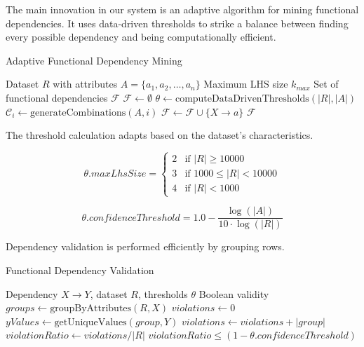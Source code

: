 \documentclass[sigconf]{acmart}
\begin{document}
The main innovation in our system is an adaptive algorithm for mining functional dependencies. It uses data-driven thresholds to strike a balance between finding every possible dependency and being computationally efficient.

\begin{algorithm}
\caption{Adaptive Functional Dependency Mining}
\label{alg:fd-mining}
\begin{algorithmic}[1]
\REQUIRE Dataset $R$ with attributes $A = \{a_1, a_2, \ldots, a_n\}$
\REQUIRE Maximum LHS size $k_{max}$
\ENSURE Set of functional dependencies $\mathcal{F}$
\STATE $\mathcal{F} \leftarrow \emptyset$
\STATE $\theta \leftarrow 
\text{computeDataDrivenThresholds}(|R|, |A|)$
    \STATE $\mathcal{C}_i \leftarrow \text{generateCombinations}(A, i)$
                \STATE $\mathcal{F} \leftarrow \mathcal{F} \cup \{X \rightarrow a\}$
            \ENDIF
        \ENDFOR
    \ENDFOR
\ENDFOR
\STATE \RETURN $\mathcal{F}$
\end{algorithmic}
\end{algorithm}

The threshold calculation adapts based on the dataset's characteristics.

$$\theta.maxLhsSize = \begin{cases}
2 & \text{if } |R| \geq 10000 \\
3 & \text{if } 1000 \leq |R| < 10000 \\
4 & \text{if } |R| < 1000
\end{cases}$$

$$\theta.confidenceThreshold = 1.0 - \frac{\log(|A|)}{10 \cdot \log(|R|)}$$

Dependency validation is performed efficiently by grouping rows.

\begin{algorithm}
\caption{Functional Dependency Validation}
\label{alg:fd-validate}
\begin{algorithmic}[1]
\REQUIRE Dependency $X \rightarrow Y$, dataset $R$, thresholds $\theta$
\ENSURE Boolean validity
\STATE $groups \leftarrow \text{groupByAttributes}(R, X)$
\STATE $violations \leftarrow 0$
    \STATE $yValues \leftarrow \text{getUniqueValues}(group, Y)$
        \STATE $violations \leftarrow violations + |group|$
    \ENDIF
\ENDFOR
\STATE $violationRatio \leftarrow violations / |R|$
\STATE \RETURN $violationRatio \leq 
(1 - \theta.confidenceThreshold)$
\end{algorithmic}
\end{algorithm}
\end{document}
